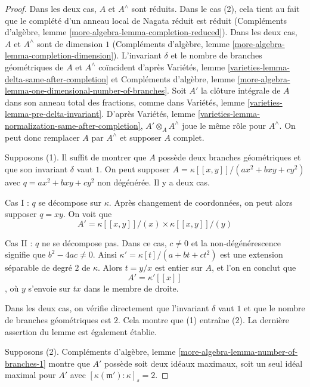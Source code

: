 \begin{proof}
Dans les deux cas, $A$ et $A^\wedge$ sont réduits. Dans le cas (2), cela tient au fait que le complété d'un anneau local de Nagata réduit est réduit (Compléments d'algèbre, lemme \ref{more-algebra-lemma-completion-reduced}). Dans les deux cas, $A$ et $A^\wedge$ sont de dimension $1$ (Compléments d'algèbre, lemme \ref{more-algebra-lemma-completion-dimension}). L'invariant $\delta$ et le nombre de branches géométriques de $A$ et $A^\wedge$ coïncident d'après Variétés, lemme \ref{varieties-lemma-delta-same-after-completion} et Compléments d'algèbre, lemme \ref{more-algebra-lemma-one-dimensional-number-of-branches}. Soit $A'$ la clôture intégrale de $A$ dans son anneau total des fractions, comme dans Variétés, lemme \ref{varieties-lemma-pre-delta-invariant}. D'après Variétés, lemme \ref{varieties-lemma-normalization-same-after-completion}, $A' \otimes_A A^\wedge$ joue le même rôle pour $A^\wedge$. On peut donc remplacer $A$ par $A^\wedge$ et supposer $A$ complet.

\medskip\noindent
Supposons (1). Il suffit de montrer que $A$ possède deux branches géométriques et que son invariant $\delta$ vaut $1$. On peut supposer $A = \kappa[[x, y]]/(ax^2 + bxy + cy^2)$ avec $q = ax^2 + bxy + cy^2$ non dégénérée. Il y a deux cas.

\medskip\noindent
Cas I : $q$ se décompose sur $\kappa$. Après changement de coordonnées, on peut alors supposer $q = xy$. On voit que
$$
A' = \kappa[[x, y]]/(x) \times \kappa[[x, y]]/(y)
$$

\medskip\noindent
Cas II : $q$ ne se décompose pas. Dans ce cas, $c \not = 0$ et la non-dégénérescence signifie que $b^2 - 4ac \not = 0$. Ainsi $\kappa' = \kappa[t]/(a + bt + ct^2)$ est une extension séparable de degré $2$ de $\kappa$. Alors $t = y/x$ est entier sur $A$, et l'on en conclut que $$
A' = \kappa'[[x]]
$$, où $y$ s'envoie sur $tx$ dans le membre de droite.

\medskip\noindent
Dans les deux cas, on vérifie directement que l'invariant $\delta$ vaut $1$ et que le nombre de branches géométriques est $2$. Cela montre que (1) entraîne (2). La dernière assertion du lemme est également établie.

\medskip\noindent
Supposons (2). Compléments d'algèbre, lemme \ref{more-algebra-lemma-number-of-branches-1} montre que $A'$ possède soit deux idéaux maximaux, soit un seul idéal maximal pour $A'$ avec $[\kappa(\mathfrak m') : \kappa]_s = 2$.


\end{proof}
